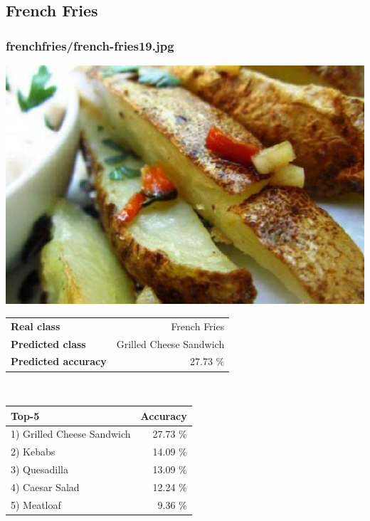 \subsection{French Fries}
    
\subsubsection{french\textunderscore fries/french-fries19.jpg}

\begin{minipage}[t]{0.4\textwidth}
	\vspace{0pt}
	\includegraphics[width=\linewidth]{images/evaluation-images/french_fries/french-fries19.jpg}
\end{minipage}
\hfill
\begin{minipage}[t]{0.5\textwidth}
	\vspace{0pt}\raggedright
	\begin{tabularx}{\textwidth}{X r}
		\small \textbf{Real class} & \small French Fries\\
		\small \textbf{Predicted class} & \small Grilled Cheese Sandwich\\
		\small \textbf{Predicted accuracy} & \small 27.73 \%
    \end{tabularx}\\
    
    \vspace{6pt}
	\begin{tabularx}{\textwidth}{X r}
        \small \textbf{Top-5} & \small \textbf{Accuracy} \\
        \hline
		\small 1) Grilled Cheese Sandwich & \small 27.73 \%\\\small 2) Kebabs & \small 14.09 \%\\\small 3) Quesadilla & \small 13.09 \%\\\small 4) Caesar Salad & \small 12.24 \%\\\small 5) Meatloaf & \small 9.36 \%
    \end{tabularx}
\end{minipage}
    
